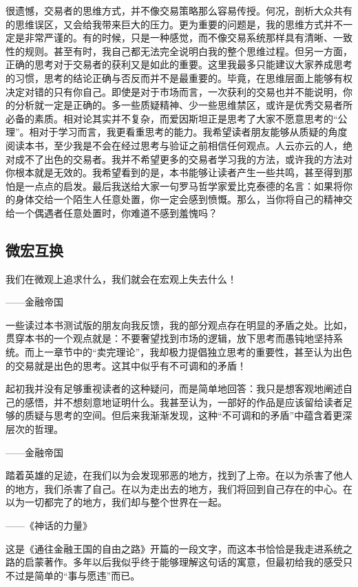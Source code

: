 很遗憾，交易者的思维方式，并不像交易策略那么容易传授。何况，剖析大众共有的思维误区，又会给我带来巨大的压力。更为重要的问题是，我的思维方式并不一定是非常严谨的。有的时候，只是一种感觉，而不像交易系统那样具有清晰、一致性的规则。甚至有时，我自己都无法完全说明白我的整个思维过程。但另一方面，正确的思考对于交易者的获利又是如此的重要。这里我最多只能建议大家养成思考的习惯，思考的结论正确与否反而并不是最重要的。毕竟，在思维层面上能够有权决定对错的只有你自己。即使是对于市场而言，一次获利的交易也并不能说明，你的分析就一定是正确的。多一些质疑精神、少一些思维禁区，或许是优秀交易者所必备的素质。相对论其实并不复杂，而爱因斯坦正是思考了大家不愿意思考的“公理”。相对于学习而言，我更看重思考的能力。我希望读者朋友能够从质疑的角度阅读本书，至少我是不会在经过思考与验证之前相信任何观点。人云亦云的人，绝对成不了出色的交易者。我并不希望更多的交易者学习我的方法，或许我的方法对你根本就是无效的。我希望看到的是，本书能够让读者产生一些共鸣，甚至得到那怕是一点点的启发。最后我送给大家一句罗马哲学家爱比克泰德的名言：如果将你的身体交给一个陌生人任意处置，你一定会感到愤慨。那么，当你将自己的精神交给一个偶遇者任意处置时，你难道不感到羞愧吗？

\subsection{微宏互换}

{\kaishu
我们在微观上追求什么，我们就会在宏观上失去什么！

\hfill ——金融帝国

一些读过本书测试版的朋友向我反馈，我的部分观点存在明显的矛盾之处。比如，贯穿本书的一个观点就是：不要奢望找到市场的逻辑，放下思考而愚钝地坚持系统。而上一章节中的“卖完理论”，我却极力提倡独立思考的重要性，甚至认为出色的交易就是出色的思考。这其中似乎有不可调和的矛盾！

起初我并没有足够重视读者的这种疑问，而是简单地回答：我只是想客观地阐述自己的感悟，并不想刻意地证明什么。我甚至认为，一部好的作品是应该留给读者足够的质疑与思考的空间。但后来我渐渐发现，这种“不可调和的矛盾”中蕴含着更深层次的哲理。

\hfill ——金融帝国

踏着英雄的足迹，在我们以为会发现邪恶的地方，找到了上帝。在以为杀害了他人的地方，我们杀害了自己。在以为走出去的地方，我们将回到自己存在的中心。在以为一切都完了的地方，我们却与整个世界在一起。

\hfill ——《神话的力量》
}

这是《通往金融王国的自由之路》开篇的一段文字，而这本书恰恰是我走进系统之路的启蒙著作。多年以后我似乎终于能够理解这句话的寓意，但最初给我的感受只不过是简单的“事与愿违”而已。

